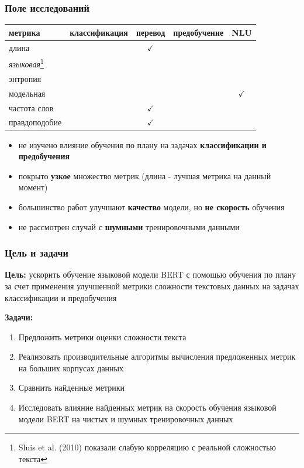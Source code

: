 \documentclass{beamer}
\begin{document}
\begin{frame}
	\frametitle{Поле исследований}
	\begin{table}
		\begin{tabular}{l|cccc}
			метрика & классификация & перевод & предобучение & NLU \\
			\hline
			длина & & $\checkmark$ & & \\
			{\it языковая}\footnote[1]{Sluis et al. (2010) показали слабую корреляцию с реальной сложностью текста} & & & & \\
			энтропия & & & & \\
			модельная & & & & $\checkmark$ \\
			частота слов & & $\checkmark$ & & \\
			правдоподобие & & $\checkmark$ & & \\
			\hline
		\end{tabular}
	\end{table}
	\begin{itemize}
		\item не изучено влияние обучения по плану на задачах {\bf классификации и предобучения}
		\item покрыто {\bf узкое} множество метрик (длина - лучшая метрика на данный момент)
		\item большинство работ улучшают {\bf качество} модели, но {\bf не скорость} обучения
		\item не рассмотрен случай с {\bf шумными} тренировочными данными
	\end{itemize}
\end{frame}

\begin{frame}
	\frametitle{Цель и задачи}
	{\bf Цель:} ускорить обучение языковой модели BERT с помощью обучения по плану за счет применения улучшенной метрики сложности текстовых данных на задачах классификации и предобучения
	
	{\bf Задачи:}
	\begin{enumerate}
		\item Предложить метрики оценки сложности текста
		\item Реализовать производительные алгоритмы вычисления предложенных метрик на больших корпусах данных
		\item Сравнить найденные метрики
		\item Исследовать влияние найденных метрик на скорость обучения языковой модели BERT на чистых и шумных тренировочных данных
	\end{enumerate}
\end{frame}
\end{document}
